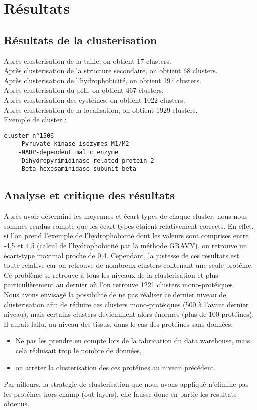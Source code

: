 \section*{Résultats}

\subsection*{Résultats de la clusterisation}
Après clusterisation de la taille, on obtient 17 clusters.\\
Après clusterisation de la structure secondaire, on obtient 68 clusters.\\
Après clusterisation de l'hydrophobicité, on obtient 197 clusters.\\
Après clusterisation du pHi, on obtient 467 clusters.\\
Après clusterisation des cystéines, on obtient 1022 clusters.\\
Après clusterisation de la localisation, on obtient 1929 clusters.\\

Exemple de cluster :
\begin{verbatim}
cluster n°1506
	-Pyruvate kinase isozymes M1/M2
	-NADP-dependent malic enzyme
	-Dihydropyrimidinase-related protein 2
	-Beta-hexosaminidase subunit beta
\end{verbatim}
\subsection*{Analyse et critique des résultats}
Après avoir déterminé les moyennes et écart-types de chaque cluster, nous nous sommes rendus compte que les écart-types étaient relativement corrects. En effet, si l'on prend l'exemple de l'hydrophobicité dont les valeurs sont comprises entre -4,5 et 4,5 (calcul de l'hydrophobicité par la méthode GRAVY), on retrouve un écart-type maximal proche de 0,4. Cependant, la justesse de ces résultats est toute relative car on retrouve de nombreux clusters contenant une seule protéine.\\
Ce problème se retrouve à tous les niveaux de la clusterisation et plus particulièrement au dernier où l'on retrouve 1221 clusters mono-protéiques.\\

Nous avons envisagé la possibilité de ne pas réaliser ce dernier niveau de clusterisation afin de réduire ces clusters mono-protéiques (500 à l'avant dernier niveau), mais certains clusters deviennnent alors énormes (plus de 100 protéines). Il aurait fallu, au niveau des tissus, dans le cas des protéines sans données:
\begin{itemize}
\item Ne pas les prendre en compte lors de la fabrication du data warehouse, mais cela réduisait trop le nombre de données,
\item ou arr\^eter la clusterisation des ces protéines au niveau précédent.\\
\end{itemize}

Par ailleurs, la stratégie de clusterisation que nous avons appliqué n'élimine pas les protéines hors-champ (out layers), elle fausse donc en partie les résultats obtenus.



